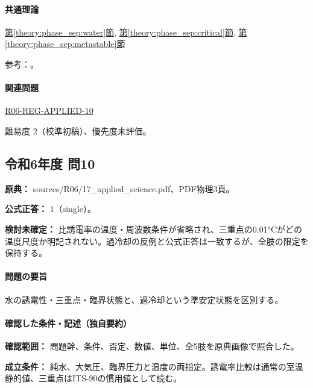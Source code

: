 \paragraph{共通理論} \hyperref[theory:phase_sep:water]{第\ref*{theory:phase_sep:water}節}, \hyperref[theory:phase_sep:critical]{第\ref*{theory:phase_sep:critical}節}, \hyperref[theory:phase_sep:metastable]{第\ref*{theory:phase_sep:metastable}節}

\par 参考：\cite{iapws_supercooled2015,iapws95_2018,si_brochure9}。

\paragraph{関連問題} \hyperref[q:r06-reg-applied-10]{R06-REG-APPLIED-10}

\par 難易度 2（校準初稿）、優先度未評価。

\subsection{令和6年度 問10}
\label{q:r06-reg-applied-10}

\noindent\textbf{原典：} sources/R06/17\_applied\_science.pdf、PDF物理3頁。

\textbf{公式正答：} 1（single）。

\par\textbf{検討未確定：} 比誘電率の温度・周波数条件が省略され、三重点の0.01°Cがどの温度尺度か明記されない。過冷却の反例と公式正答は一致するが、全肢の限定を保持する。

\paragraph{問題の要旨} 水の誘電性・三重点・臨界状態と、過冷却という準安定状態を区別する。

\paragraph{確認した条件・記述（独自要約）}\mbox{}\par

\noindent\textbf{確認範囲：} 問題幹、条件、否定、数値、単位、全5肢を原典画像で照合した。\par

\noindent\textbf{成立条件：} 純水、大気圧、臨界圧力と温度の両指定。誘電率比較は通常の室温静的値、三重点はITS-90の慣用値として読む。\par

